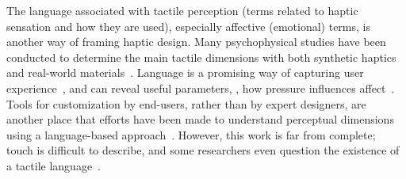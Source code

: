 The language associated with tactile perception (terms related to haptic sensation and how they are used), especially affective (emotional) terms, is another way of framing haptic design.
Many psychophysical studies have been conducted to determine the main tactile dimensions with both synthetic haptics and real-world materials~\citep{Enriquez2003,Okamoto2013}.
Language is a promising way of capturing user experience~\citep{Obrist2013}, and can reveal useful parameters, \eg, how pressure influences affect~\citep{Zheng2012}.
Tools for customization by end-users, rather than by expert designers, are another place that efforts have been made to understand perceptual dimensions using a language-based approach~\citep{Seifi2014,Seifi2015}.
However, this work is far from complete; touch is difficult to describe, and some researchers even question the existence of a tactile language~\citep{Jansson-Boyd2011}.




%



